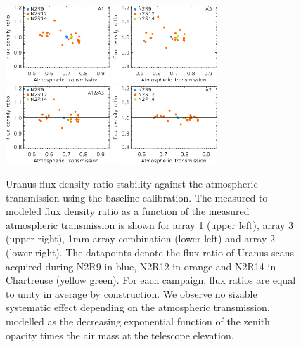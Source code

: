 \begin{figure}[!htbp]
  \begin{center}
    \includegraphics[clip=true, trim={0, -0.3cm, -0.3cm, 0}, width=0.35\textwidth]{Figures/Calibration/plot_flux_density_ratio_obstau_uranus_corrected_skydip_narrow_a1.pdf}
    \includegraphics[clip=true, trim={0, -0.3cm, -0.3cm, 0}, width=0.35\textwidth]{Figures/Calibration/plot_flux_density_ratio_obstau_uranus_corrected_skydip_narrow_a3.pdf}
    \includegraphics[clip=true, trim={0, -0.3cm, -0.3cm, 0}, width=0.35\textwidth]{Figures/Calibration/plot_flux_density_ratio_obstau_uranus_corrected_skydip_narrow_1mm.pdf}
    \includegraphics[clip=true, trim={0, -0.3cm, -0.3cm, 0}, width=0.35\textwidth]{Figures/Calibration/plot_flux_density_ratio_obstau_uranus_corrected_skydip_narrow_a2.pdf}
    \caption[Uranus flux density stability against atmospheric
      transmission]{Uranus flux density ratio stability against the
      atmospheric transmission using the baseline calibration.
      The measured-to-modeled flux density
      ratio as a function of the measured atmospheric transmission is
      shown for array 1 (upper left), array 3 (upper right), 1mm array
      combination (lower left) and array 2 (lower right).
      The datapoints denote the flux ratio of Uranus scans acquired
      during N2R9 in blue, N2R12 in orange and N2R14 in Chartreuse
      (yellow green).
      For each campaign, flux ratios are equal to unity in average by
      construction. We observe no sizable systematic effect depending
      on the atmospheric transmission, modelled as the decreasing exponential
      function of the zenith opacity times the air mass at the
      telescope elevation.}
\label{fig:uranus_flux_obstau}
\end{center}
\end{figure}
